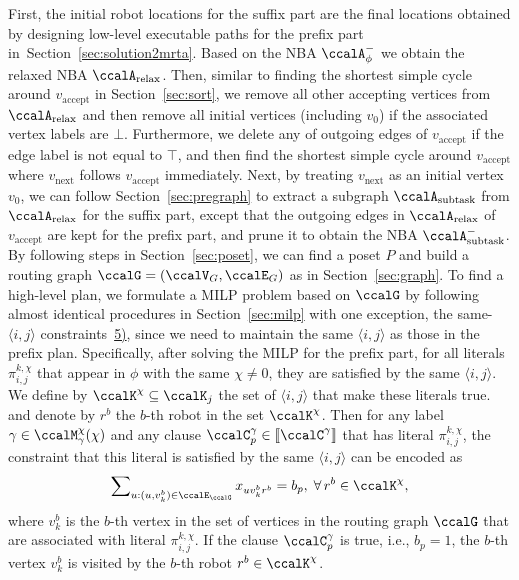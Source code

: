 \documentclass[journal]{IEEEtran}
\newcommand{\clause}[1]{\llbracket \ccalC^{#1} \rrbracket}
\newcommand{\auto}[1]{\ccalA_{\text{#1}}}
\newcommand{\autop}{\ccalA_{\phi}}
\newcommand{\ag}[2]{\langle#1,#2\rangle}
\renewcommand{\ap}[3]{\mathcal{\pi}_{{#1},{#2}}^{#3}}
\newcommand{\aap}[4]{\mathcal{\pi}_{{#1},{#2}}^{#3,#4}}
\begin{document}
{{  First, the initial robot locations for the suffix part are the final locations obtained by designing low-level executable paths for the prefix part in~Section~\ref{sec:solution2mrta}.  Based on the NBA $\autop^-$ we obtain the relaxed NBA $\auto{relax}$.  Then, similar to finding the shortest simple cycle around $v_{\text{accept}}$ in Section~\ref{sec:sort}, we remove all other accepting vertices from $\auto{relax}$ and then remove all initial vertices (including $v_0$) if the associated vertex labels are $\bot$. Furthermore, we delete any of outgoing edges of $v_{\text{accept}}$ if the edge label is not equal to $\top$, and then find the shortest simple cycle around $v_{\text{accept}}$ where $v_{\text{next}}$ follows $v_{\text{accept}}$ immediately. Next, by treating $v_{\text{next}}$ as an initial vertex $v_{0}$, we can follow Section~\ref{sec:pregraph} to extract a subgraph $\auto{subtask}$ from $\auto{relax}$ for the suffix part, except that the outgoing edges in $\auto{relax}$ of $v_{\text{accept}}$ are kept for the prefix part, and prune it to obtain the NBA $\auto{subtask}^-$}.
  By following steps in Section~\ref{sec:poset}, we can find a poset $P$  and build a routing graph $\ccalG = (\ccalV_G, \ccalE_G)$ as in Section~\ref{sec:graph}. To find a high-level plan, we formulate a MILP problem based on $\ccalG$ by following almost identical procedures in Section~\ref{sec:milp} with one exception, the  same-$\ag{i}{j}$ constraints~\hyperref[sec:samegroup]{5)}, since we need to maintain the same $\ag{i}{j}$ as those in the prefix plan. Specifically, after solving the MILP for the prefix part, for all literals $\ap{i}{j}{k,\chi}$ that appear in $\phi$ with the same $\chi\not=0$, they are satisfied by the same $\ag{i}{j}$. We define by $\ccalK^\chi \subseteq \ccalK_j$ the set of $\ag{i}{j}$ that make these literals true. and denote by  $r^b$ the $b$-th robot in the set $\ccalK^\chi$. Then for any label $\gamma \in\ccalM_\mathsf{\gamma}^\chi(\chi)$ and any clause $\ccalC_p^\gamma \in \clause{\gamma}$ that has  literal $\aap{i}{j}{k}{\chi}$, {the constraint} that this literal is satisfied by the same $\ag{i}{j}$  can be encoded as}
\begingroup\makeatletter\def\f@size{9}\check@mathfonts
\def\maketag@@@#1{\hbox{\m@th\normalsize\normalfont#1}}%
\begin{align}
    \sum\nolimits_{u:(u, v_k^b) \in \ccalE_\ccalG} x_{u v_k^b r^b} =  b_p, \;\forall\, r^b \in \ccalK^\chi,
  \end{align}
\endgroup
where $v_k^b$ is the $b$-th vertex in the set of vertices in the routing graph $\ccalG$  that are associated with literal $\ap{i}{j}{k,\chi}$. If the clause $\ccalC_p^\gamma$ is true, i.e.,  $b_p=1$, the $b$-th vertex $v_k^b$ is visited by the $b$-th robot $r^b \in \ccalK^\chi$.
\end{document}
